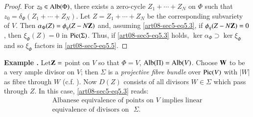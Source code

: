 \begin{proof}
For $z_{0}\in \operatorname{\mathrm{Alb}}(\Phi)$, there exists a zero-cycle $Z_{1}+\cdots+Z_{N}$ on $\Phi$ such that $z_{0}=\delta_{\Phi}(Z_{1}+\cdots+Z_{N})$. Let $Z=Z_{1}+\cdots+Z_{N}$ be the corresponding subvariety of $V$. Then $\alpha_{\Phi}(Z)=\phi_{q}(Z-N\mathbf{Z})$ and, assuming \eqref{art08-sec5-eq5.3}, if $\phi_{q}(Z-N\mathbf{Z})=0$, then $\xi_{\Phi}(Z)=0$ in $\operatorname{\mathrm{Pic}}(\Sigma)$. Thus, if \eqref{art08-sec5-eq5.3} holds, $\ker \alpha_{\Phi}\supset \ker \xi_{\Phi}$ and so $\xi_{\Phi}$ factors in \eqref{art08-sec5-eq5.5}.
\end{proof}

\medskip
\noindent
{\bf Example .\label{art08-sec5-exam2}}
Let\pageoriginale $\mathbf{Z}=$ point on $V$ so that $\Phi=V$, $\operatorname{\mathrm{Alb}}(\Pi)=\operatorname{\mathrm{Alb}}(V)$. Choose $\mathbf{W}$ to be a very ample divisor on $V$; then $\Sigma$ is a {\em projective fibre bundle} over $\operatorname{\mathrm{Pic}}(V)$ with $|W|$ as fibre through $W$ (c.f. \cite{art08-key18}). Now $D(Z)$ consists of all divisors $W\in \Sigma$ which pass through $Z$. In this case, \eqref{art08-sec5-eq5.3} reads:
\begin{equation*}
\begin{array}{l}
\text{Albanese equivalence of points on $V$ implies linear}\\[2pt]
\text{equivalence of divisors on~ } \Sigma.
\end{array}\tag{5.6}\label{art08-sec5-eq5.6}
\end{equation*}


